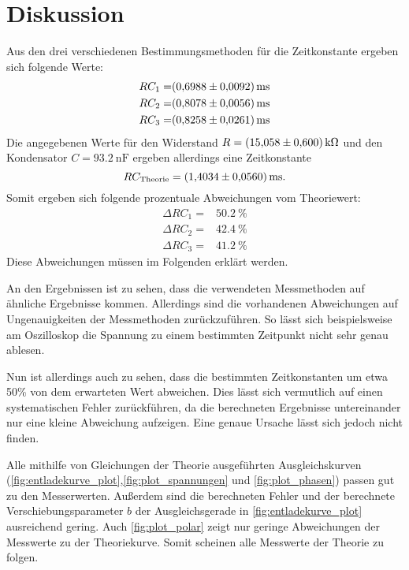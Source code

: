 \section{Diskussion}
\label{sec:Diskussion}



Aus den drei verschiedenen Bestimmungsmethoden für die Zeitkonstante ergeben sich folgende Werte:
\begin{align}
    RC_1 =& \SI{0.6988+-0.0092}{\milli\second} \\
    RC_2 =& \SI{0.8078+-0.0056}{\milli\second} \\
    RC_3 =& \SI{0.8258+-0.0261}{\milli\second}
\end{align}
Die angegebenen Werte für den Widerstand $R=\SI{15.058+-0.6}{\kilo\ohm}$ und den Kondensator $C=\SI{93.2}{\nano\farad}$ ergeben allerdings eine Zeitkonstante
\begin{equation}
    RC_\text{Theorie} = \SI{1.4034+-0.056}{\milli\second}.
\end{equation}
Somit ergeben sich folgende prozentuale Abweichungen vom Theoriewert:
\begin{align}
    \Delta RC_1 =& \SI{50.2}{\percent} \\
    \Delta RC_2 =& \SI{42.4}{\percent} \\
    \Delta RC_3 =& \SI{41.2}{\percent} 
\end{align} 
Diese Abweichungen müssen im Folgenden erklärt werden.

An den Ergebnissen ist zu sehen, dass die verwendeten Messmethoden auf ähnliche Ergebnisse kommen.
Allerdings sind die vorhandenen Abweichungen auf Ungenauigkeiten der Messmethoden zurückzuführen. So lässt sich beispielsweise am Oszilloskop die Spannung zu einem bestimmten Zeitpunkt nicht sehr genau ablesen. 

Nun ist allerdings auch zu sehen, dass die bestimmten Zeitkonstanten um etwa 50\% von dem erwarteten Wert abweichen. Dies lässt sich vermutlich auf einen systematischen Fehler zurückführen, da die berechneten Ergebnisse untereinander nur eine kleine Abweichung aufzeigen. Eine genaue Ursache lässt sich jedoch nicht finden.

Alle mithilfe von Gleichungen der Theorie ausgeführten Ausgleichskurven (\autoref{fig:entladekurve_plot},\autoref{fig:plot_spannungen} und \autoref{fig:plot_phasen}) passen gut zu den Messerwerten. 
Außerdem sind die berechneten Fehler und der berechnete Verschiebungsparameter $b$ der Ausgleichsgerade in \autoref{fig:entladekurve_plot} ausreichend gering. 
Auch \autoref{fig:plot_polar} zeigt nur geringe Abweichungen der Messwerte zu der Theoriekurve. 
Somit scheinen alle Messwerte der Theorie zu folgen.

